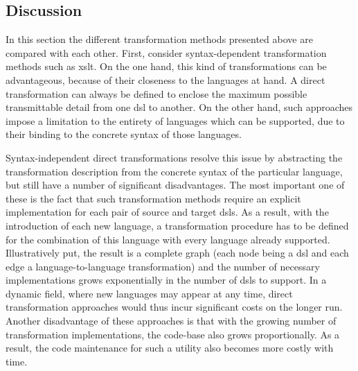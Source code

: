 \subsection{Discussion}

In this section the different transformation methods presented above are compared with each other. First, consider syntax-dependent transformation methods such as \gls{xslt}. On the one hand, this kind of transformations can be advantageous, because of their closeness to the languages at hand. A direct transformation can always be defined to enclose the maximum possible transmittable detail from one \gls{dsl} to another. On the other hand, such approaches impose a limitation to the entirety of languages which can be supported, due to their binding to the concrete syntax of those languages.

Syntax-independent direct transformations resolve this issue by abstracting the transformation description from the concrete syntax of the particular language, but still have a number of significant disadvantages. The most important one of these is the fact that such transformation methods require an explicit implementation for each pair of source and target \glspl{dsl}. As a result, with the introduction of each new language, a transformation procedure has to be defined for the combination of this language with every language already supported. Illustratively put, the result is a complete graph (each node being a \gls{dsl} and each edge a language-to-language transformation) and the number of necessary implementations grows exponentially in the number of \glspl{dsl} to support. In a dynamic field, where new languages may appear at any time, direct transformation approaches would thus incur significant costs on the longer run. Another disadvantage of these approaches is that with the growing number of transformation implementations, the code-base also grows proportionally. As a result, the code maintenance for such a utility also becomes more costly with time. 

